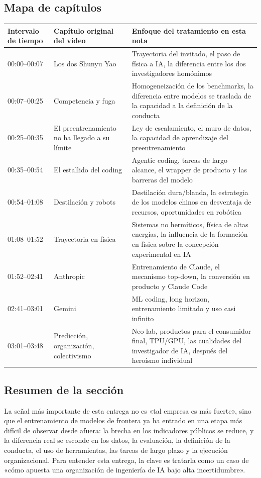 \documentclass[a4paper]{article}
\begin{document}
\subsection{Mapa de capítulos}

\noindent\begin{longtable}{p{}p{}p{}}
\toprule
Intervalo de tiempo & Capítulo original del video & Enfoque del tratamiento en esta nota \\
\midrule
00:00--00:07 & Los dos Shunyu Yao & Trayectoria del invitado, el paso de física a IA, la diferencia entre los dos investigadores homónimos \\
00:07--00:25 & Competencia y fuga & Homogeneización de los benchmarks, la diferencia entre modelos se traslada de la capacidad a la definición de la conducta \\
00:25--00:35 & El preentrenamiento no ha llegado a su límite & Ley de escalamiento, el muro de datos, la capacidad de aprendizaje del preentrenamiento \\
00:35--00:54 & El estallido del coding & Agentic coding, tareas de largo alcance, el wrapper de producto y las barreras del modelo \\
00:54--01:08 & Destilación y robots & Destilación dura/blanda, la estrategia de los modelos chinos en desventaja de recursos, oportunidades en robótica \\
01:08--01:52 & Trayectoria en física & Sistemas no hermíticos, física de altas energías, la influencia de la formación en física sobre la concepción experimental en IA \\
01:52--02:41 & Anthropic & Entrenamiento de Claude, el mecanismo top-down, la conversión en producto y Claude Code \\
02:41--03:01 & Gemini & ML coding, long horizon, entrenamiento limitado y uso casi infinito \\
03:01--03:48 & Predicción, organización, colectivismo & Neo lab, productos para el consumidor final, TPU/GPU, las cualidades del investigador de IA, después del heroísmo individual \\
\bottomrule
\end{longtable}

\subsection{Resumen de la sección}

La señal más importante de esta entrega no es «tal empresa es más fuerte», sino que el entrenamiento de modelos de frontera ya ha entrado en una etapa más difícil de observar desde afuera: la brecha en los indicadores públicos se reduce, y la diferencia real se esconde en los datos, la evaluación, la definición de la conducta, el uso de herramientas, las tareas de largo plazo y la ejecución organizacional. Para entender esta entrega, la clave es tratarla como un caso de «cómo apuesta una organización de ingeniería de IA bajo alta incertidumbre».
\end{document}
